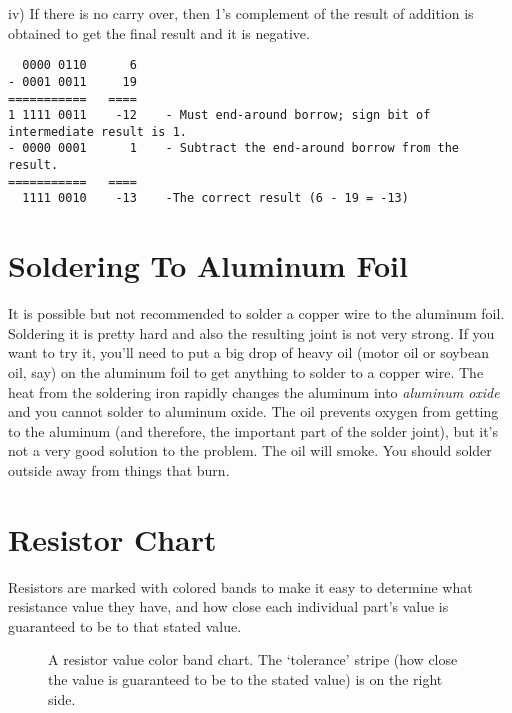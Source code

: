 iv) If there is no carry over, then 1's complement of the result of addition is obtained to get the final result and it is negative.




\begin{verbatim}
  0000 0110      6
- 0001 0011     19
===========   ====
1 1111 0011    -12    - Must end-around borrow; sign bit of intermediate result is 1.
- 0000 0001      1    - Subtract the end-around borrow from the result.
===========   ====
  1111 0010    -13    -The correct result (6 - 19 = -13)
\end{verbatim}



\section*{Soldering To Aluminum Foil}

It is possible but not recommended to solder a copper wire to the aluminum foil. Soldering it is pretty hard and also the resulting joint is not very strong. If you want to try it, you'll need to put a big drop of heavy oil (motor oil or soybean oil, say) on the aluminum foil to get anything to solder to a copper wire. The heat from the soldering iron rapidly changes the aluminum into \emph{aluminum oxide} and you cannot solder to aluminum oxide. The oil prevents oxygen from getting to the aluminum (and therefore, the important part of the solder joint), but it's not a very good solution to the problem. The oil will smoke. You should solder outside away from things that burn.


\section*{Resistor Chart}

Resistors are marked with colored bands to make it easy to determine what resistance value they have, and how close each individual part's value is guaranteed to be to that stated value.


\begin{figure}[h!]
\begin{center}
\end{center}
\caption{A resistor value color band chart. The `tolerance' stripe (how close the value is guaranteed to be to the stated value) is on the right side. }
\label{fig:resistorchart}
\end{figure}
